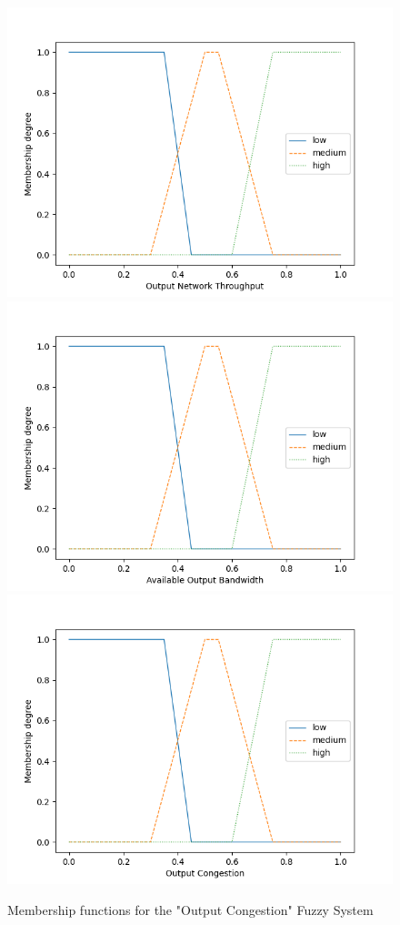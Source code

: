 \begin{figure}[!htb]
    \centering
    \hspace*{-1cm}
    
    \includegraphics[width=.33\textwidth]{images/plots/OutNetThroughput.png}\hfill
    \includegraphics[width=.33\textwidth]{images/plots/AvailOutBandwidth.png}\hfill
    \includegraphics[width=.33\textwidth]{images/plots/OutCongestion.png}
    
    \hspace*{-1cm}
    \caption{Membership functions for the "Output Congestion" Fuzzy System}
    \label{fig:FS_OUTC_FSETS}
\end{figure}


